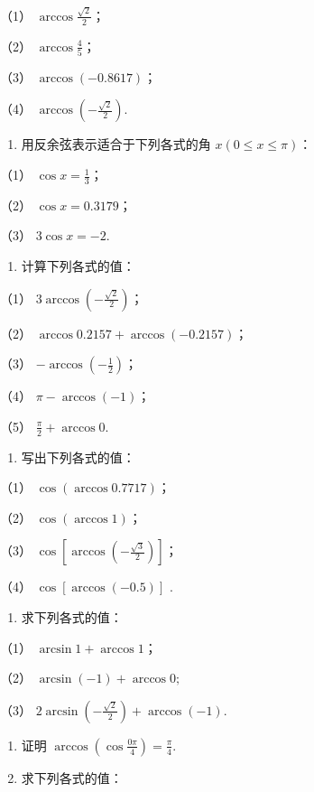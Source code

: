 （1） \(\arccos \frac{\sqrt{2}}{2}\)；

（2） \(\arccos \frac{4}{5}\)；

（3） \(\arccos (-0.8617)\)；

（4） \(\arccos \left(-\frac{\sqrt{2}}{2}\right)\).

\begin{enumerate}[start=2]
\item
  用反余弦表示适合于下列各式的角 \(x(0 \leqslant x \leqslant \pi)\)：
\end{enumerate}

（1） \(\cos x = \frac{1}{3}\)；

（2） \(\cos x = 0.3179\)；

（3） \(3 \cos x = -2.\)

\begin{enumerate}[start=3]
\item
  计算下列各式的值：
\end{enumerate}

（1） \(3 \arccos\left(-\frac{\sqrt{2}}{2}\right)\)；

（2） \(\arccos 0.2157 + \arccos (-0.2157)\)；

（3） \(-\arccos\left(-\frac{1}{2}\right)\)；

（4） \(\pi - \arccos(-1)\)；

（5） \(\frac{\pi}{2} + \arccos 0\).

\begin{enumerate}[start=4]
\item
  写出下列各式的值：
\end{enumerate}

（1） \(\cos(\arccos0.7717)\)；

（2） \(\cos(\arccos1)\)；

（3） \(\cos \left[\arccos \left(-\frac{\sqrt{3}}{2}\right)\right]\)；

（4） \(\cos[\arccos(-0.5)]\) .

\begin{enumerate}[start=5]
\item
  求下列各式的值：
\end{enumerate}

（1） \(\arcsin 1 + \arccos 1\)；

（2） \(\arcsin (-1) + \arccos 0;\)

（3） \(2\arcsin \left(-\frac{\sqrt{2}}{2}\right) + \arccos (-1)\).

\begin{enumerate}[start=6]
\item
  证明 \(\arccos\left(\cos\frac{0\pi}{4}\right)=\frac{\pi}{4}\).
\item
  求下列各式的值：
\end{enumerate}

